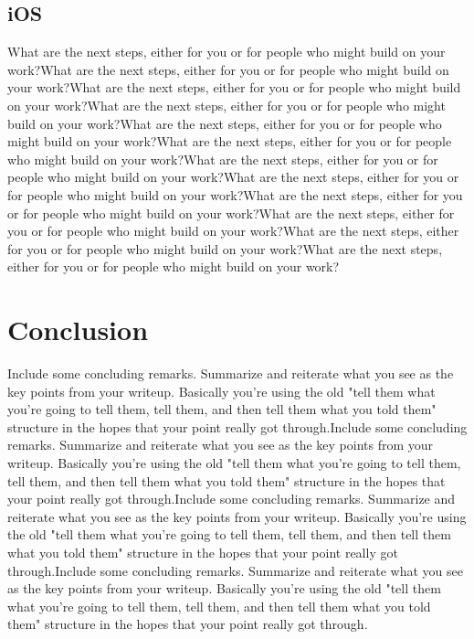\documentclass{acm_proc_article-sp}
\begin{document}
\subsection{iOS}
What are the next steps, either for you or for people who might build on your work?What are the next steps, either for you or for people who might build on your work?What are the next steps, either for you or for people who might build on your work?What are the next steps, either for you or for people who might build on your work?What are the next steps, either for you or for people who might build on your work?What are the next steps, either for you or for people who might build on your work?What are the next steps, either for you or for people who might build on your work?What are the next steps, either for you or for people who might build on your work?What are the next steps, either for you or for people who might build on your work?What are the next steps, either for you or for people who might build on your work?What are the next steps, either for you or for people who might build on your work?What are the next steps, either for you or for people who might build on your work?


\section{Conclusion}
Include some concluding remarks. Summarize and reiterate what you see as the key points from your writeup. Basically you're using the old "tell them what you're going to tell them, tell them, and then tell them what you told them" structure in the hopes that your point really got through.Include some concluding remarks. Summarize and reiterate what you see as the key points from your writeup. Basically you're using the old "tell them what you're going to tell them, tell them, and then tell them what you told them" structure in the hopes that your point really got through.Include some concluding remarks. Summarize and reiterate what you see as the key points from your writeup. Basically you're using the old "tell them what you're going to tell them, tell them, and then tell them what you told them" structure in the hopes that your point really got through.Include some concluding remarks. Summarize and reiterate what you see as the key points from your writeup. Basically you're using the old "tell them what you're going to tell them, tell them, and then tell them what you told them" structure in the hopes that your point really got through.
\end{document}
